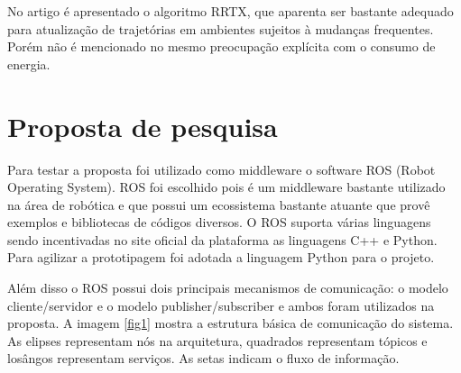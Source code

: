 \documentclass[eq,capa]{texufpel}
\begin{document}
No artigo \cite{2015rrt} é apresentado o algoritmo RRTX, que aparenta ser bastante adequado para atualização de trajetórias em ambientes sujeitos à mudanças frequentes. Porém não é mencionado no mesmo preocupação explícita com o consumo de energia. 



\chapter{Proposta de pesquisa}

Para testar a proposta foi utilizado como middleware o software ROS (Robot Operating System). ROS foi escolhido pois é um middleware bastante utilizado na área de robótica \cite{2023swarmslam}\cite{2021smmr} e que possui um ecossistema bastante atuante que provê exemplos e bibliotecas de códigos diversos. O ROS suporta várias linguagens sendo incentivadas no site oficial da plataforma as linguagens C++ e Python. Para agilizar a prototipagem foi adotada a linguagem Python para o projeto.

Além disso o ROS possui dois principais mecanismos de comunicação: o modelo cliente/servidor e o modelo publisher/subscriber e ambos foram utilizados na proposta. A imagem \ref{fig1} mostra a estrutura básica de comunicação do sistema. As elipses representam nós na arquitetura, quadrados representam tópicos e losângos representam serviços. As setas indicam o fluxo de informação. 


\end{document}
